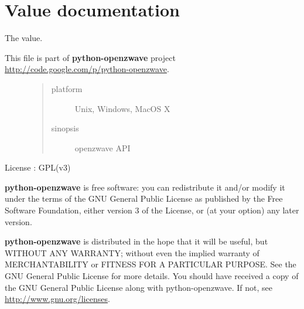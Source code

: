 \documentclass[letterpaper,10pt,english]{sphinxmanual}
\begin{document}
\section{Value documentation}
\label{value:value-documentation}\label{value::doc}
The value.
\label{value:module-openzwave.value}\label{value:module-openzwave.value}\begin{description}
\item[{This file is part of \textbf{python-openzwave} project \href{http://code.google.com/p/python-openzwave}{http://code.google.com/p/python-openzwave}.}] \leavevmode\begin{quote}\begin{description}
\item[{platform}] \leavevmode
Unix, Windows, MacOS X

\item[{sinopsis}] \leavevmode
openzwave API

\end{description}\end{quote}

\end{description}

License : GPL(v3)

\textbf{python-openzwave} is free software: you can redistribute it and/or modify
it under the terms of the GNU General Public License as published by
the Free Software Foundation, either version 3 of the License, or
(at your option) any later version.

\textbf{python-openzwave} is distributed in the hope that it will be useful,
but WITHOUT ANY WARRANTY; without even the implied warranty of
MERCHANTABILITY or FITNESS FOR A PARTICULAR PURPOSE. See the
GNU General Public License for more details.
You should have received a copy of the GNU General Public License
along with python-openzwave. If not, see \href{http://www.gnu.org/licenses}{http://www.gnu.org/licenses}.
\end{document}
